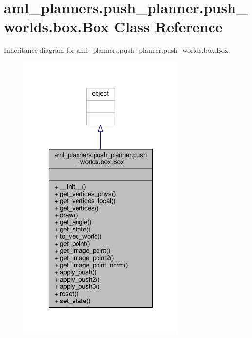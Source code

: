 \hypertarget{classaml__planners_1_1push__planner_1_1push__worlds_1_1box_1_1_box}{\section{aml\-\_\-planners.\-push\-\_\-planner.\-push\-\_\-worlds.\-box.\-Box Class Reference}
\label{classaml__planners_1_1push__planner_1_1push__worlds_1_1box_1_1_box}
}


Inheritance diagram for aml\-\_\-planners.\-push\-\_\-planner.\-push\-\_\-worlds.\-box.\-Box\-:\nopagebreak
\begin{figure}[H]
\begin{center}
\leavevmode
\includegraphics[width=238pt]{classaml__planners_1_1push__planner_1_1push__worlds_1_1box_1_1_box__inherit__graph}
\end{center}
\end{figure}


